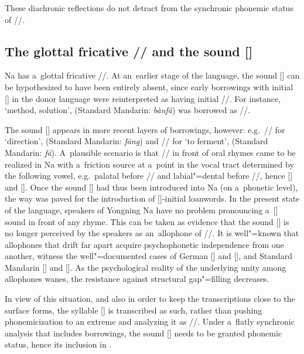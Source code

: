 			These {diachronic} reflections
			do not detract from the synchronic phonemic status of //.
			
			
			\subsection{The glottal fricative // and the sound  []}
			\label{sec:theglottalfricativeandthesound}
			
			Na has a~glottal fricative //. At an~earlier stage of the language, the sound [] can
			be hypothesized to have been entirely absent, since early  borrowings with initial []
			in the donor language were reinterpreted as having initial //. For instance, ‘method, solution’, 
			(Standard {Mandarin}: \textit{bànfǎ}) was borrowed as //.
			
			The sound [] appears in more recent layers of borrowings, however: e.g.~// for ‘direction’, 
			(Standard {Mandarin}: \textit{fāng}) and // for ‘to ferment’, 
			(Standard {Mandarin}: \textit{fā}). A~plausible scenario is
			that // in front of oral rhymes came to be realized in Na with a~friction source at a~point
			in the vocal tract determined by the following vowel, e.g.~palatal before // and
			labial"=dental before //, hence [] and []. Once the sound [] had thus been introduced into Na (on a~phonetic level), the way was paved for the introduction of []-initial
			loanwords. In the present state of the language, speakers of Yongning Na have no problem pronouncing a~[] sound in front of any rhyme. This can be taken as evidence that the sound [] is no longer perceived by the speakers as
			an~allophone of //. It is well"=known that allophones that drift far apart acquire psychophonetic independence from one another, witness the well"=documented cases of German []
			and [], and Standard {Mandarin} [] and []. As the psychological reality of the
			underlying unity among allophones wanes, the resistance against structural gap"=filling decreases.
			
			In view of this situation, and also in order to keep the transcriptions close to the surface forms,
			the syllable [] is transcribed as such, rather than pushing phonemicization to an extreme and analyzing it as //. Under a~flatly synchronic
			analysis that includes  borrowings, the sound [] needs to be granted phonemic
			status, hence its inclusion in . 
			
